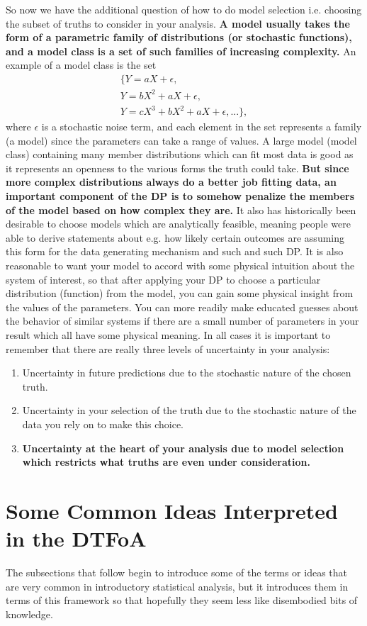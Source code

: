 So now we have the additional question of how to do model selection i.e. choosing the subset of truths to consider in your analysis. \textbf{A model usually takes the form of a parametric family of distributions (or stochastic functions), and a model class is a set of such families of increasing complexity.} An example of a model class is the set
\begin{align}
\{ Y = aX + \epsilon,\\
 Y = bX^2 + aX + \epsilon, \\
 Y = cX^3+bX^2+aX+\epsilon, ...\},
\end{align} 
where $\epsilon$ is a stochastic noise term, and each element in the set represents a family (a model) since the parameters can take a range of values. A large model (model class) containing many member distributions which can fit most data is good as it represents an openness to the various forms the truth could take. \textbf{But since more complex distributions always do a better job fitting data, an important component of the DP is to somehow penalize the members of the model based on how complex they are.} It also has historically been desirable to choose models which are analytically feasible, meaning people were able to derive statements about e.g. how likely certain outcomes are assuming this form for the data generating mechanism and such and such DP. It is also reasonable to want your model to accord with some physical intuition about the system of interest, so that after applying your DP to choose a particular distribution (function) from the model, you can gain some physical insight from the values of the parameters. You can more readily make educated guesses about the behavior of similar systems if there are a small number of parameters in your result which all have some physical meaning. In all cases it is important to remember that there are really three levels of uncertainty in your analysis:
\begin{enumerate}
\item Uncertainty in future predictions due to the stochastic nature of the chosen truth.
\item  Uncertainty in your selection of the truth due to the stochastic nature of the data you rely on to make this choice.
\item \textbf{Uncertainty at the heart of your analysis due to model selection which restricts what truths are even under consideration. }
\end{enumerate}


\section{Some Common Ideas Interpreted in the DTFoA}
The subsections that follow begin to introduce some of the terms or ideas that are very common in introductory statistical analysis, but it introduces them in terms of this framework so that hopefully they seem less like disembodied bits of knowledge. 

